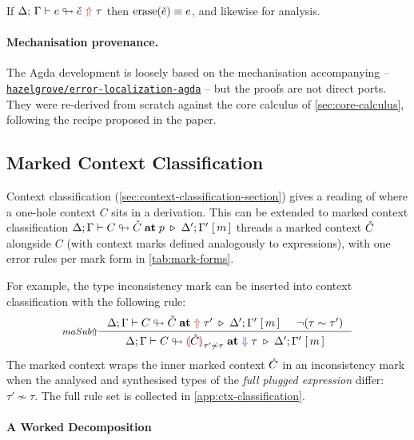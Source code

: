 \begin{theorem}
\label{thm:mark-erase}
If $\synmark{e}{\chk e}{\tau}$ then $\mathrm{erase}(\chk e) \equiv e$, and
likewise for analysis.
\end{theorem}

\paragraph{Mechanisation provenance.}
The Agda development is loosely based on the mechanisation accompanying
\textcite{Marking2024} --
\href{https://github.com/hazelgrove/error-localization-agda}{\texttt{hazelgrove/error-localization-agda}}
-- but the proofs are not direct ports. They were re-derived from
scratch against the core calculus of \cref{sec:core-calculus}, following the recipe proposed in the paper.

\subsection{\yo Marked Context Classification}
\label{sec:marking-classification}

Context classification (\cref{sec:context-classification-section}) gives a
reading of where a one-hole context $C$ sits in a derivation.
This can be extended to marked context classification
$\mctxclass[\Delta;\Gamma]{C}{\chk C}{p}{\Delta';\Gamma'}{m}$ threads a
marked context $\chk C$ alongside $C$ (with context marks defined analogously to expressions), with one error rules per mark form in \cref{tab:mark-forms}.

For example, the type inconsistency mark can be inserted into context classification with the following rule:
\[
\inference[$maSub{\Uparrow}$]
  {\mctxclass[\Delta;\Gamma]{C}{\chk C}{{\color{BrickRed}\Uparrow}\;\tau'}{\Delta';\Gamma'}{m}
   & \neg(\tau \sim \tau')}
  {\mctxclass[\Delta;\Gamma]{C}{\markincon[\chk C]{\tau'}{\tau}}{{\color{BlueViolet}\Downarrow}\;\tau}{\Delta';\Gamma'}{m}}
\]
The marked context wraps the inner marked context $\chk C$ in an inconsistency mark when the analysed and synthesised types of the \textit{full plugged expression} differ: $\tau' \not\sim \tau$. The full rule set is collected in \cref{app:ctx-classification}.

\paragraph{\yo A Worked Decomposition}
\label{sec:marking-classification-insideout}

